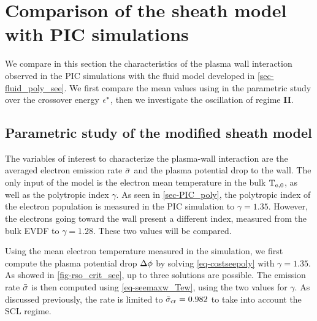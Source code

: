 

\section{Comparison of the sheath model with PIC simulations} \label{subsec-picandmodel}


  We compare in this section the characteristics of the plasma wall interaction observed in the \ac{PIC} simulations with the fluid model developed in \cref{sec-fluid_poly_see}.
  We first compare the mean values using in the parametric study over the crossover energy $\epsilon^{*}$, then we investigate the oscillation of regime {\bf II}.

  \subsection{Parametric study of the modified sheath model} \label{subsec-param_sheath_see}

    The variables of interest to characterize the plasma-wall interaction are the averaged electron emission rate $ \bar{\sigma }$ and the plasma potential drop to the wall.
    The only input of the model is the electron mean temperature in the bulk $\mathrm{T_{e, 0}}$, as well as the polytropic index $\gamma$.
    As seen in \cref{sec-PIC_poly}, the polytropic index of the electron population is measured in the \ac{PIC} simulation to $\gamma=1.35$.
    However, the electrons going toward the wall present a different index, measured from the bulk \ac{EVDF} to $\gamma=1.28$.
    These two values will be compared.

    Using the mean electron temperature measured in the simulation, we first compute the plasma potential drop $\Delta \phi$ by solving \cref{eq-costseepoly} with $\gamma=1.35$.
    As showed in \cref{fig-rso_crit_see}, up to three solutions are possible.
    The emission rate $ \bar{\sigma }$ is then computed using \cref{eq-seemaxw_Tew}, using the two values for $\gamma$.
    As discussed previously, the rate is limited to $ \bar{\sigma }_{\rm cr}=0.982$ to take into account the \ac{SCL} regime.

